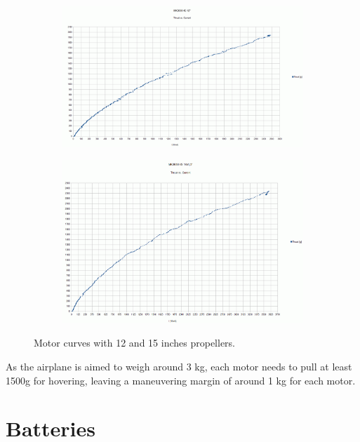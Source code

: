 \begin{figure}[h]
  \centering
  \begin{subfigure}{.8\textwidth}
    \centering
    \includegraphics[width=\linewidth]{figs/curve12.png}
  
  \end{subfigure}%
  
  \begin{subfigure}{.8\textwidth}
    \centering
    \includegraphics[width=\linewidth]{figs/curve15.png}

  \end{subfigure}
  \caption{Motor curves with 12 and 15 inches propellers.}
  \label{fig:motorcurves}
\end{figure}


As the airplane is aimed to weigh around 3 kg, each motor needs to pull at least 1500g for hovering, leaving a maneuvering margin of around 1 kg for each motor.

\section{Batteries}

